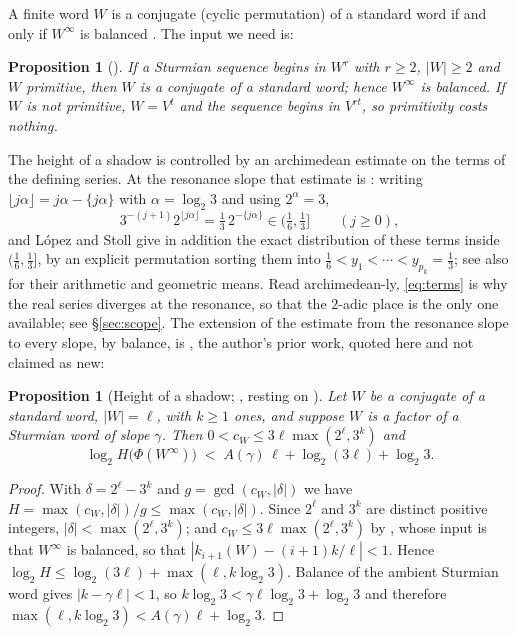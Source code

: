 \documentclass[11pt,reqno]{amsart}
\theoremstyle{plain}
\newtheorem{proposition}[theorem]{Proposition}
\theoremstyle{definition}
\newcommand{\PH}{\Phi}
\newcommand{\Av}{A(\gamma)}
\begin{document}
A finite word $W$ is a conjugate (cyclic permutation) of a standard word if and only if $W^\infty$
is balanced \cite[Ch.~2]{Lothaire02}. The input we need is:

\begin{proposition}[{\cite[Proposition 3.2]{BHZ06}}]\label{prop:bhz32}
If a Sturmian sequence begins in $W^{r}$ with $r\ge2$, $|W|\ge2$ and $W$ primitive, then $W$ is a
conjugate of a standard word; hence $W^{\infty}$ is balanced. If $W$ is not primitive, $W=V^{t}$ and
the sequence begins in $V^{rt}$, so primitivity costs nothing.
\end{proposition}

The height of a shadow is controlled by an archimedean estimate on the terms of the defining series.
At the resonance slope that estimate is \cite[Lemma 43, \S11]{LS21}: writing
$\lfloor j\alpha\rfloor=j\alpha-\{j\alpha\}$ with $\alpha=\log_2 3$ and using $2^{\alpha}=3$,
\begin{equation}\label{eq:terms}
  3^{-(j+1)}2^{\lfloor j\alpha\rfloor}=\tfrac13\,2^{-\{j\alpha\}}\in\bigl(\tfrac16,\tfrac13\bigr]
  \qquad (j\ge0),
\end{equation}
and L\'opez and Stoll give in addition the exact distribution of these terms inside
$(\frac16,\frac13]$, by an explicit permutation sorting them into
$\frac16<y_1<\cdots<y_{p_k}=\frac13$; see also \cite[Lemmas 41--42]{LS21} for their arithmetic and
geometric means. Read archimedean-ly, \eqref{eq:terms} is why the real series diverges at the
resonance, so that the $2$-adic place is the only one available; see \S\ref{sec:scope}. The
extension of the estimate from the resonance slope to every slope, by balance, is
\cite[Lemma 10.4]{DJirr}, the author's prior work, quoted here and not claimed as new:

\begin{proposition}[{Height of a shadow; \cite[Lemma 10.4]{DJirr}, resting on
\cite[Lemma 43]{LS21}}]\label{prop:height}
Let $W$ be a conjugate of a standard word, $|W|=\ell$, with $k\ge1$ ones, and suppose $W$ is a
factor of a Sturmian word of slope $\gamma$. Then $0<c_W\le3\ell\max(2^{\ell},3^{k})$ and
\[
  \log_2 H\bigl(\PH(W^{\infty})\bigr)\;<\;\Av\,\ell+\log_2(3\ell)+\log_2 3 .
\]
\end{proposition}

\begin{proof}
With $\delta=2^{\ell}-3^{k}$ and $g=\gcd(c_W,|\delta|)$ we have $H=\max(c_W,|\delta|)/g\le
\max(c_W,|\delta|)$. Since $2^{\ell}$ and $3^{k}$ are distinct positive integers,
$|\delta|<\max(2^{\ell},3^{k})$; and $c_W\le3\ell\max(2^{\ell},3^{k})$ by
\cite[Lemma 10.4]{DJirr}, whose input is that $W^{\infty}$ is balanced, so that
$|k_{i+1}(W)-(i+1)k/\ell|<1$. Hence $\log_2 H\le\log_2(3\ell)+\max(\ell,k\log_2 3)$. Balance of the
ambient Sturmian word gives $|k-\gamma\ell|<1$, so $k\log_2 3<\gamma\ell\log_2 3+\log_2 3$ and
therefore $\max(\ell,k\log_2 3)<\Av\ell+\log_2 3$.
\end{proof}
\end{document}
